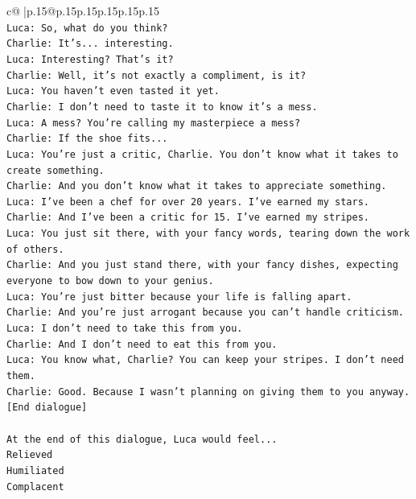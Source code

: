 \documentclass{article}
\begin{document}
{\begin{supertabular}{c@{$\;$}|p{.15\linewidth}@{}p{.15\linewidth}p{.15\linewidth}p{.15\linewidth}p{.15\linewidth}p{.15\linewidth}}
{{{\\ 
\texttt{Luca: So, what do you think?} \\
\texttt{Charlie: It's... interesting.} \\
\texttt{Luca: Interesting? That's it?} \\
\texttt{Charlie: Well, it's not exactly a compliment, is it?} \\
\texttt{Luca: You haven't even tasted it yet. } \\
\texttt{Charlie: I don't need to taste it to know it's a mess.} \\
\texttt{Luca: A mess? You're calling my masterpiece a mess?} \\
\texttt{Charlie: If the shoe fits...} \\
\texttt{Luca: You're just a critic, Charlie. You don't know what it takes to create something.} \\
\texttt{Charlie: And you don't know what it takes to appreciate something. } \\
\texttt{Luca: I've been a chef for over 20 years. I've earned my stars.} \\
\texttt{Charlie: And I've been a critic for 15. I've earned my stripes.} \\
\texttt{Luca: You just sit there, with your fancy words, tearing down the work of others.} \\
\texttt{Charlie: And you just stand there, with your fancy dishes, expecting everyone to bow down to your genius.} \\
\texttt{Luca: You're just bitter because your life is falling apart.} \\
\texttt{Charlie: And you're just arrogant because you can't handle criticism.} \\
\texttt{Luca: I don't need to take this from you.} \\
\texttt{Charlie: And I don't need to eat this from you.} \\
\texttt{Luca: You know what, Charlie? You can keep your stripes. I don't need them.} \\
\texttt{Charlie: Good. Because I wasn't planning on giving them to you anyway.} \\
\texttt{{[}End dialogue{]}} \\
\\ 
\texttt{At the end of this dialogue, Luca would feel...} \\
\texttt{Relieved} \\
\texttt{Humiliated} \\
\texttt{Complacent} \\
}}}
\end{supertabular}}
\end{document}
